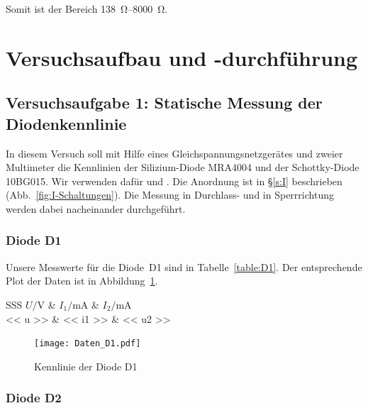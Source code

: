 Somit ist der Bereich \SIrange{138}{8000}{\ohm}.


\FloatBarrier
\section{Versuchsaufbau und -durchführung}

\FloatBarrier
\subsection{Versuchsaufgabe 1: Statische Messung der Diodenkennlinie}

In diesem Versuch soll mit Hilfe eines Gleichspannungsnetzgerätes und zweier
Multimeter die Kennlinien der Silizium-Diode MRA4004 und der Schottky-Diode
10BG015. Wir verwenden dafür \fehlt und \fehlt. Die Anordnung ist in §\ref{s:I}
beschrieben (Abb.~\ref{fig:I-Schaltungen}). Die Messung in Durchlass- und in
Sperrrichtung werden dabei nacheinander durchgeführt.

\FloatBarrier
\subsubsection{Diode D1}

Unsere Messwerte für die Diode~D1 sind in Tabelle~\ref{table:D1}. Der
entsprechende Plot der Daten ist in Abbildung~\ref{fig:D1}.

\begin{table}[htbp]
	\centering
	\caption{%
		Messdaten zur Diode D1
	}
	\label{table:D1}
	\begin{tabular}{SSS}
		{$U / \si\volt$} & {$I_1 / \si{\milli\ampere}$} & {$I_2 / \si{\milli\ampere}$} \\
		\hline
		<< u >> & << i1 >> & << u2 >> \\
	\end{tabular}
\end{table}

\begin{figure}[htbp]
	\centering
	\caption{%
		Kennlinie der Diode D1
	}
	\label{fig:D1}
	\texttt{[image: Daten\_D1.pdf]}
\end{figure}

\FloatBarrier
\subsubsection{Diode D2}

